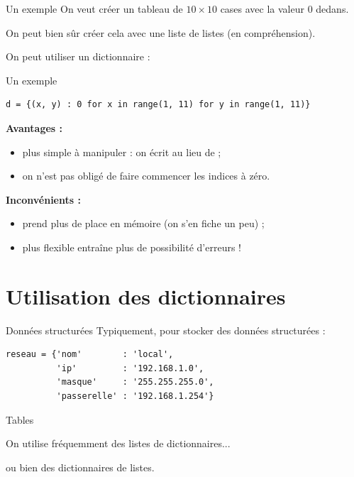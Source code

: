 \documentclass[10pt]{beamer}
\begin{document}
\begin{frame}{Un exemple}
On veut créer un tableau de $10\times 10$ cases avec la valeur 0 dedans.\\\pause

On peut bien sûr créer cela avec une liste de listes (en compréhension).\\\pause

On peut utiliser un dictionnaire :\\\pause
\end{frame}
\begin{frame}[fragile]{Un exemple}

\begin{verbatim}
d = {(x, y) : 0 for x in range(1, 11) for y in range(1, 11)}
\end{verbatim}
\pause

\textbf{Avantages :}
\begin{itemize}
    \item 	plus simple à manipuler : on écrit  au lieu de  ;
    \item 	on n'est pas obligé de faire commencer les indices à zéro.
\end{itemize}

\textbf{Inconvénients :}
\begin{itemize}
    \item prend plus de place en mémoire (on s'en fiche un peu) ;
    \item plus flexible entraîne plus de possibilité d'erreurs !
\end{itemize}
\end{frame}


\section{Utilisation des dictionnaires}


\begin{frame}[fragile]{Données structurées}
Typiquement, pour stocker des données structurées :    \\\pause

\begin{verbatim}
reseau = {'nom'        : 'local',
          'ip'         : '192.168.1.0',
          'masque'     : '255.255.255.0',
          'passerelle' : '192.168.1.254'}
\end{verbatim}
\end{frame}

\begin{frame}{Tables}

On utilise fréquemment des listes de dictionnaires...\\\pause

ou bien des dictionnaires de listes.
\end{frame}
\end{document}
